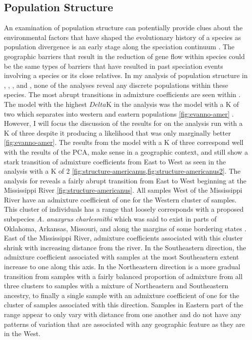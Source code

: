 \subsection{Population Structure}
An examination of population structure can potentially provide clues about the 
environmental factors that have shaped the evolutionary history of a species as 
population divergence is an early stage along the speciation continuum \parencite{mallet2008}.
The geographic barriers that result in the reduction of gene flow within species
could be the same types of barriers that have resulted in past speciation events 
involving a species or its close relatives.
In my analysis of population structure in \amer, \fowl, \terr, and \wood,
none of the \structure analyses reveal any discrete populations within these species.
The most abrupt transitions in admixture coefficients are seen within \amer.
The \structure model with the highest $Delta$K in the \amer analysis was the model
with a K of two which separates \amer into western and eastern populations
\cref{fig:evanno-amer} \parencite{evanno2005}. 
However, I will focus the discussion of the \structure results for \amer on the 
analysis run with a K of three despite it producing a likelihood that was only 
marginally better \cref{fig:evanno-amer}.
The results from the model with a K of three correspond well with the results of 
the PCA, make sense in a geographic context, and still show a stark 
transition of admixture coefficients from East to West as seen in the analysis 
with a K of 2 \cref{fig:structure-americanus,fig:structure-americanus2}.
The \structure analysis for \amer reveals a fairly abrupt transition from East
to West beginning at the Mississippi River \cref{fig:structure-americanus}.
All samples West of the Mississippi River have an admixture coefficient of one for the 
Western cluster of samples.
This cluster of individuals has a range that loosely corresponds with a proposed
subspecies \textit{A. anaxyrus charlesmithi} which was said to exist in parts  
of Oklahoma, Arkansas, Missouri, and along the margins of some bordering states 
\parencite{bragg1954}.
East of the Mississippi River, admixture coefficients associated with this cluster
shrink with increasing distance from the river. 
In the Southeastern direction, the admixture coefficient associated with samples
at the most Southeastern extent increase to one along this axis.
In the Northeastern direction is a more gradual transition from samples with 
a fairly balanced proportion of admixture from all three clusters to samples  
with a mixture of Northeastern and Southeastern ancestry, to finally a single
sample with an admixture coefficient of one for the cluster of samples associated
with this direction.
Samples in Eastern part of the \amer range appear to only vary with distance 
from one another and do not have any patterns of variation that are associated 
with any geographic feature as they are in the West.

